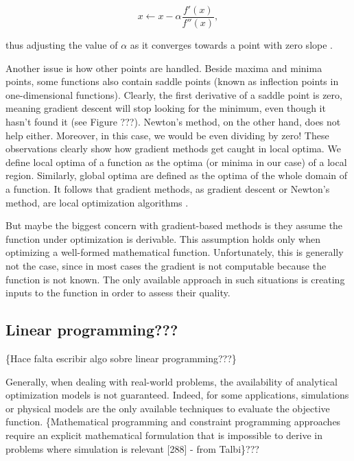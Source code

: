 \begin{equation}
x\leftarrow x-\alpha\frac{f'(x)}{f''(x)},
\end{equation}


\noindent thus adjusting the value of $\alpha$ as it converges towards
a point with zero slope \cite{Luke-Essentials_of_metaheuristics:2009}.

Another issue is how other points are handled. Beside maxima and minima
points, some functions also contain saddle points (known as inflection
points in one-dimensional functions). Clearly, the first derivative
of a saddle point is zero, meaning gradient descent will stop looking
for the minimum, even though it hasn't found it (see Figure ???).
Newton's method, on the other hand, does not help either. Moreover,
in this case, we would be even dividing by zero! These observations
clearly show how gradient methods get caught in local optima. We define
local optima of a function as the optima (or minima in our case) of
a local region. Similarly, global optima are defined as the optima
of the whole domain of a function. It follows that gradient methods,
as gradient descent or Newton\textquoteright{}s method, are local
optimization algorithms \cite{Luke-Essentials_of_metaheuristics:2009}.

But maybe the biggest concern with gradient-based methods is they
assume the function under optimization is derivable. This assumption
holds only when optimizing a well-formed mathematical function. Unfortunately,
this is generally not the case, since in most cases the gradient is
not computable because the function is not known. The only available
approach in such situations is creating inputs to the function in
order to assess their quality.


\subsection{Linear programming???}

\{Hace falta escribir algo sobre linear programming???\}

Generally, when dealing with real-world problems, the availability
of analytical optimization models is not guaranteed. Indeed, for some
applications, simulations or physical models are the only available
techniques to evaluate the objective function. \{Mathematical programming
and constraint programming approaches require an explicit mathematical
formulation that is impossible to derive in problems where simulation
is relevant {[}288{]} - from Talbi\}???


